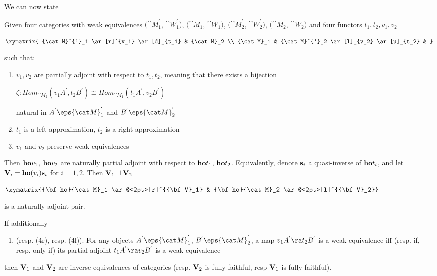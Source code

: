 We can now state
\begin{thm}
\label{thm:generalexistencetotalderivedadjoint2}
Given four categories with weak equivalences $({\cat M}^{'}_1$, ${\cat W}^{'}_1)$, $({\cat M}_1$, ${\cat W}_1)$, $({\cat M}^{'}_2$, ${\cat W}^{'}_2)$, $({\cat M}_2$, ${\cat W}_2)$ and four functors $t_1, t_2, v_1, v_2$
\begin{center}
$\xymatrix{
    {\cat M}^{'}_1 \ar[r]^{v_1} \ar[d]_{t_1} & {\cat M}_2 \\
    {\cat M}_1 & {\cat M}^{'}_2 \ar[l]_{v_2} \ar[u]_{t_2} &
    }$
\end{center}
such that:
\begin{enumerate}
\item
$v_1, v_2$ are partially adjoint with respect to $t_1, t_2$, meaning that there exists a bijection
\begin{center}
$\zeta \colon Hom_{{\cat M}_2}(v_1A^{'}, t_2B^{'}) \cong Hom_{{\cat M}_1}(t_1A^{'}, v_2B^{'})$
\end{center}
natural in $A^{'} \eps {\cat M}^{'}_1$ and $B^{'} \eps {\cat M}^{'}_2$
\item
$t_1$ is a left approximation, $t_2$ is a right approximation
\item
$v_1$ and $v_2$ preserve weak equivalences
\end{enumerate}

Then ${\bf ho}v_1$, ${\bf ho}v_2$ are naturally partial adjoint with respect to ${\bf ho}t_1$, ${\bf ho}t_2$. Equivalently, denote ${\bf s}_i$ a quasi-inverse of ${\bf ho}t_i$, and let ${\bf V}_i = {\bf ho}(v_i) {\bf s}_i$ for $i = 1, 2$. Then ${\bf V}_1 \dashv {\bf V}_2$
\begin{center}
$\xymatrix {{\bf ho}{\cat M}_1 \ar@<2pt>[r]^{{\bf V}_1} & {\bf ho}{\cat M}_2 \ar@<2pt>[l]^{{\bf V}_2}}$
\end{center}
is a naturally adjoint pair.

If additionally
\begin{enumerate}
\item[(4)]
(resp. (4r), resp. (4l)).
For any objects $A^{'} \eps {\cat M}^{'}_1$, $B^{'} \eps {\cat M}^{'}_2$, a map $v_1A^{'} \ra t_2B^{'}$ is a weak equivalence iff (resp. if, resp. only if) its partial adjoint $t_1A^{'} \ra v_2B^{'}$ is a weak equivalence
\end{enumerate}
then ${\bf V}_1$ and ${\bf V}_2$ are inverse equivalences of categories (resp. ${\bf V}_2$ is fully faithful, resp ${\bf V}_1$ is fully faithful).
\end{thm}

